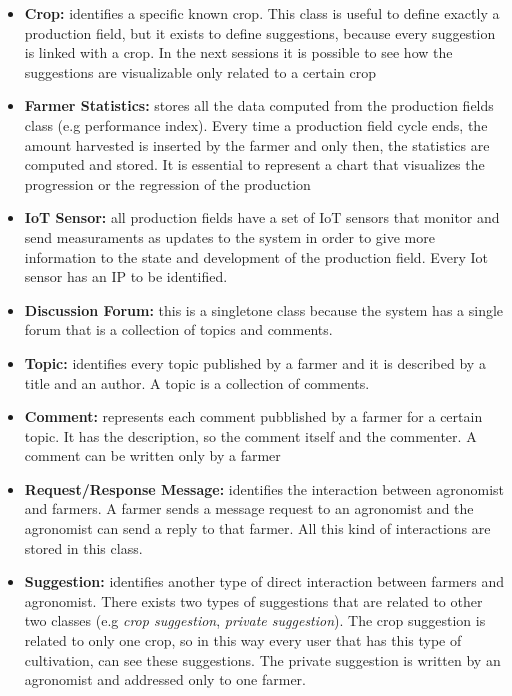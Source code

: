 \begin{itemize}
		\item \textbf{Crop:} identifies a specific known crop. This class is useful to define exactly a production field, but it exists to define suggestions, because every suggestion is linked with a crop. In the next sessions it is possible to see how the suggestions are visualizable only related to a certain crop
		
		\item \textbf{Farmer Statistics:} stores all the data computed from the production fields class (e.g performance index). Every time a production field cycle ends, the amount harvested is inserted by the farmer and only then, the statistics are computed and stored. It is essential to represent a chart that visualizes the progression or the regression of the production 
		
		\item \textbf{IoT Sensor:} all production fields have a set of IoT sensors that monitor and send measuraments as updates to the system in order to give more information to the state and development of the production field. Every Iot sensor has an IP to be identified.
		
		\item \textbf{Discussion Forum:} this is a singletone class because the system has a single forum that is a collection of topics and comments.
		
		\item \textbf{Topic:} identifies every topic published by a farmer and it is described by a title and an author. A topic is a collection of comments. 
		
		\item \textbf{Comment:} represents each comment pubblished by a farmer for a certain topic. It has the description, so the comment itself and the commenter. A comment can be written only by a farmer
		
		\item \textbf{Request/Response Message:} identifies the interaction between agronomist and farmers. A farmer sends a message request to an agronomist and the agronomist can send a reply to that farmer. All this kind of interactions are stored in this class.
		
		\item \textbf{Suggestion:} identifies another type of direct interaction between farmers and agronomist. There exists two types of suggestions that are related to other two classes (e.g \textit{crop suggestion}, \textit{private suggestion}). The crop suggestion is related to only one crop, so in this way every user that has this type of cultivation, can see these suggestions. The private suggestion is written by an agronomist and addressed only to one farmer. 
		

\end{itemize}
